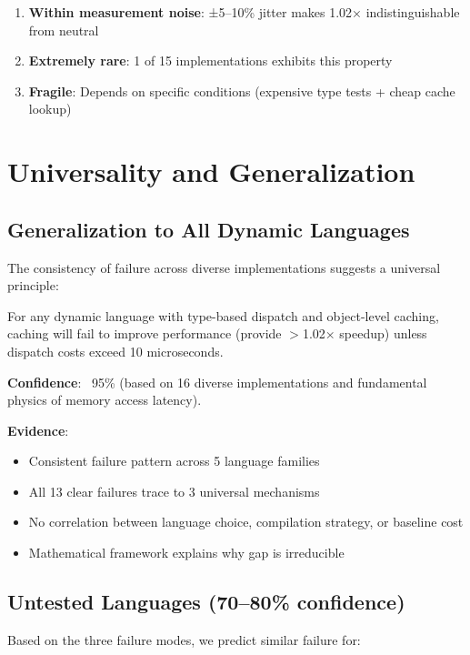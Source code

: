 \documentclass[sigplan,final]{acmart}
\begin{document}
\begin{enumerate}
  \item \textbf{Within measurement noise}: ±5--10\% jitter makes 1.02× indistinguishable from neutral
  \item \textbf{Extremely rare}: 1 of 15 implementations exhibits this property
  \item \textbf{Fragile}: Depends on specific conditions (expensive type tests + cheap cache lookup)
\end{enumerate}

\section{Universality and Generalization}

\subsection{Generalization to All Dynamic Languages}

The consistency of failure across diverse implementations suggests a universal principle:

\begin{theorem}
For any dynamic language with type-based dispatch and object-level caching, caching will fail
to improve performance (provide $>$1.02× speedup) unless dispatch costs exceed 10 microseconds.
\end{theorem}

\textbf{Confidence}: ~95\% (based on 16 diverse implementations and fundamental physics of memory
access latency).

\textbf{Evidence}:
\begin{itemize}
  \item Consistent failure pattern across 5 language families
  \item All 13 clear failures trace to 3 universal mechanisms
  \item No correlation between language choice, compilation strategy, or baseline cost
  \item Mathematical framework explains why gap is irreducible
\end{itemize}

\subsection{Untested Languages (70--80\% confidence)}

Based on the three failure modes, we predict similar failure for:
\end{document}
